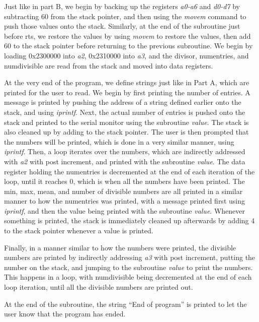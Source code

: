 \documentclass[letterpaper]{article}
\begin{document}
    Just like in part B, we begin by backing up the registers \textit{a0-a6} and \textit{d0-d7} by
    subtracting 60 from the stack pointer, and then using the \textit{movem}
    command to push those values onto the stack. Similarly, at the end of the
    subroutine just before rts, we restore the values by using \textit{movem} to restore the values,
    then add 60 to the stack pointer before returning to the previous subroutine.
    We begin by loading 0x2300000 into \textit{a2}, 0x2310000 into \textit{a3},
    and the divisor, numentries, and numdivisible are read from the stack and
    moved into data registers.

    At the very end of the program, we define strings just like
    in Part A, which are printed for the user to read.
    We begin by first printing the number of entries.
    A message is printed by pushing the address of a string defined earlier
    onto the stack, and using \textit{iprintf}. Next, the actual
    number of entries is pushed onto the stack and printed to the
    serial monitor using the subroutine \textit{value}. The stack is also cleaned up by
    adding to the stack pointer. The user is then prompted that the numbers will
    be printed, which is done in a very similar manner, using \textit{iprintf}. Then,
    a loop iterates over the numbers, which are indirectly addressed with \textit{a2} with post increment,
    and printed with the subroutine \textit{value}. The data register holding the numentries
    is decremented at the end of each iteration of the loop, until it reaches 0, which is
    when all the numbers have been printed. The min, max, mean, and number of divisible numbers are all printed
    in a similar manner to how the numentries was printed, with a message
    printed first using \textit{iprintf}, and then the value being printed
    with the subroutine \textit{value}. Whenever something is printed, the stack is
    immediately cleaned up afterwards by adding 4 to the stack pointer whenever a value is printed.

    Finally, in a manner similar to how the numbers were printed, the
    divisible numbers are printed by indirectly addressing \textit{a3} with post
    increment, putting the number on the stack, and jumping to the subroutine
    \textit{value} to print the numbers. This happens in a loop, with numdivisible
    being decremented at the end of each loop iteration, until all the
    divisible numbers are printed out.

    At the end of the subroutine, the string ``End of program'' is printed
    to let the user know that the program has ended.
\end{document}
